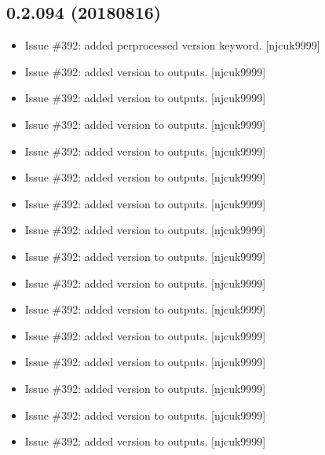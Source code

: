 \documentclass[a4paper,10pt,english]{report}
\begin{document}
\subsection{0.2.094 (2018\sphinxhyphen{}08\sphinxhyphen{}16)}
\label{\detokenize{misc/changelog:id386}}\begin{itemize}
\item {} 
Issue \#392: added per\sphinxhyphen{}processed version keyword. {[}njcuk9999{]}

\item {} 
Issue \#392: added version to outputs. {[}njcuk9999{]}

\item {} 
Issue \#392: added version to outputs. {[}njcuk9999{]}

\item {} 
Issue \#392: added version to outputs. {[}njcuk9999{]}

\item {} 
Issue \#392: added version to outputs. {[}njcuk9999{]}

\item {} 
Issue \#392: added version to outputs. {[}njcuk9999{]}

\item {} 
Issue \#392: added version to outputs. {[}njcuk9999{]}

\item {} 
Issue \#392: added version to outputs. {[}njcuk9999{]}

\item {} 
Issue \#392: added version to outputs. {[}njcuk9999{]}

\item {} 
Issue \#392: added version to outputs. {[}njcuk9999{]}

\item {} 
Issue \#392: added version to outputs. {[}njcuk9999{]}

\item {} 
Issue \#392: added version to outputs. {[}njcuk9999{]}

\item {} 
Issue \#392: added version to outputs. {[}njcuk9999{]}

\item {} 
Issue \#392: added version to outputs. {[}njcuk9999{]}

\item {} 
Issue \#392: added version to outputs. {[}njcuk9999{]}

\item {} 
Issue \#392: added version to outputs. {[}njcuk9999{]}


\end{itemize}
\end{document}
